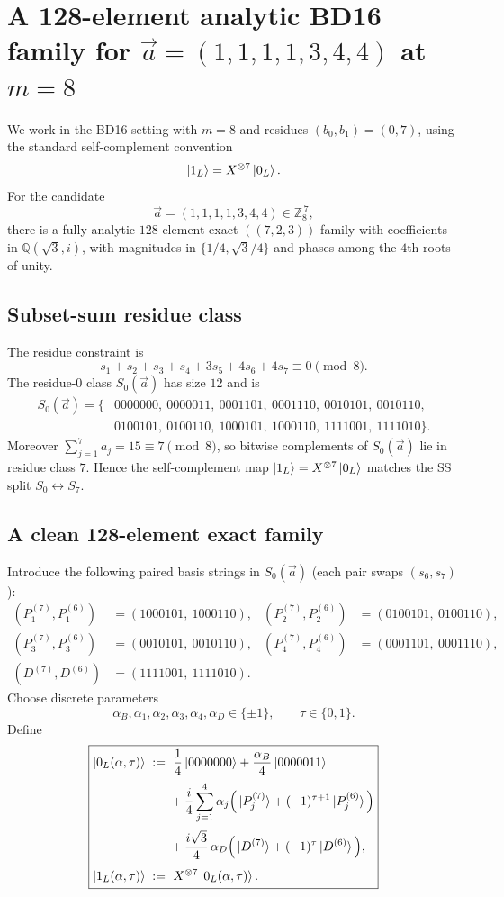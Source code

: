 \documentclass[11pt]{article}
\begin{document}
\section{A 128-element analytic BD16 family for \texorpdfstring{$\vec a=(1,1,1,1,3,4,4)$}{a=(1,1,1,1,3,4,4)} at \texorpdfstring{$m=8$}{m=8}}

We work in the BD16 setting with \(m=8\) and residues \((b_0,b_1)=(0,7)\), using the standard self-complement convention
\[
\ket{1_L}=X^{\otimes 7}\ket{0_L}.
\]
For the candidate
\[
\vec a=(1,1,1,1,3,4,4)\in\mathbb{Z}_8^{\,7},
\]
there is a fully analytic \(128\)-element exact \(((7,2,3))\) family with coefficients in \(\mathbb{Q}(\sqrt3,i)\),
with magnitudes in \(\{1/4,\sqrt3/4\}\) and phases among the \(4\)th roots of unity.

\subsection{Subset-sum residue class}
The residue constraint is
\[
s_1+s_2+s_3+s_4+3s_5+4s_6+4s_7\equiv 0\pmod 8.
\]
The residue-\(0\) class \(S_0(\vec a)\) has size \(12\) and is
\[
\begin{aligned}
S_0(\vec a)=\{&
0000000,\ 0000011,\ 0001101,\ 0001110,\ 0010101,\ 0010110,\\
&0100101,\ 0100110,\ 1000101,\ 1000110,\ 1111001,\ 1111010
\}.
\end{aligned}
\]
Moreover \(\sum_{j=1}^7 a_j=15\equiv 7\pmod8\), so bitwise complements of \(S_0(\vec a)\) lie in residue class \(7\).
Hence the self-complement map \(\ket{1_L}=X^{\otimes 7}\ket{0_L}\) matches the SS split \(S_0\leftrightarrow S_7\).

\subsection{A clean 128-element exact family}
Introduce the following paired basis strings in \(S_0(\vec a)\) (each pair swaps \((s_6,s_7)\)):
\[
\begin{aligned}
(P_1^{(7)},P_1^{(6)})&=(1000101,\ 1000110),&
(P_2^{(7)},P_2^{(6)})&=(0100101,\ 0100110),\\
(P_3^{(7)},P_3^{(6)})&=(0010101,\ 0010110),&
(P_4^{(7)},P_4^{(6)})&=(0001101,\ 0001110),\\
(D^{(7)},D^{(6)})&=(1111001,\ 1111010).
\end{aligned}
\]
Choose discrete parameters
\[
\alpha_B,\alpha_1,\alpha_2,\alpha_3,\alpha_4,\alpha_D\in\{\pm 1\},\qquad \tau\in\{0,1\}.
\]
Define
\[
\boxed{
\begin{aligned}
\ket{0_L(\alpha,\tau)} \;:=\;
&\ \frac14\ket{0000000}+\frac{\alpha_B}{4}\ket{0000011}\\[2pt]
&+\frac{i}{4}\sum_{j=1}^4 \alpha_j\Big(\ket{P_j^{(7)}} + (-1)^{\tau+1}\ket{P_j^{(6)}}\Big)\\[2pt]
&+\frac{i\sqrt3}{4}\,\alpha_D\Big(\ket{D^{(7)}} + (-1)^{\tau}\ket{D^{(6)}}\Big),\\[4pt]
\ket{1_L(\alpha,\tau)} \;:=\;&\ X^{\otimes 7}\ket{0_L(\alpha,\tau)}.
\end{aligned}
}
\]
\end{document}
